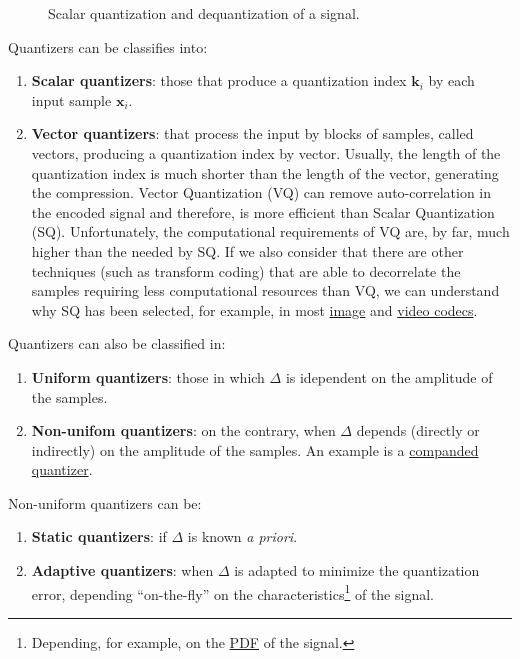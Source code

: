 \begin{figure}
  \centering
  \caption{Scalar quantization and dequantization of a signal.}
  \label{fig:Q}
\end{figure}

Quantizers can be classifies into:
\begin{enumerate}
\item \textbf{Scalar quantizers}: those that produce a quantization
  index ${\mathbf k}_i$ by each input sample ${\mathbf x}_i$.
\item \textbf{Vector quantizers}: that process the input by blocks of
  samples, called vectors, producing a quantization index by vector.
  Usually, the length of the quantization index is much shorter than
  the length of the vector, generating the compression. Vector
  Quantization (VQ) can remove auto-correlation in the encoded signal
  and therefore, is more efficient than Scalar Quantization
  (SQ). Unfortunately, the computational requirements of VQ are, by
  far, much higher than the needed by SQ. If we also consider that
  there are other techniques (such as transform coding) that are able
  to decorrelate the samples requiring less computational resources
  than VQ, we can understand why SQ has been selected, for example, in
  most \href{https://en.wikipedia.org/wiki/Image_compression}{image}
  and \href{https://en.wikipedia.org/wiki/Video_coding_format}{video
  codecs}.
\end{enumerate}

Quantizers can also be classified in:
\begin{enumerate}
\item \textbf{Uniform quantizers}: those in which $\Delta$ is
  idependent on the amplitude of the samples.
\item \textbf{Non-unifom quantizers}: on the contrary, when $\Delta$
  depends (directly or indirectly) on the amplitude of the samples. An
  example is a
  \href{https://en.wikipedia.org/wiki/Companding}{companded
    quantizer}.
\end{enumerate}

Non-uniform quantizers can be:
\begin{enumerate}
\item \textbf{Static quantizers}: if $\Delta$ is known \emph{a
priori}.
\item \textbf{Adaptive quantizers}: when $\Delta$ is adapted to
  minimize the quantization error, depending ``on-the-fly'' on the
  characteristics\footnote{Depending, for example, on the
    \href{https://en.wikipedia.org/wiki/Probability_density_function}{PDF}
    of the signal.} of the signal.
\end{enumerate}

